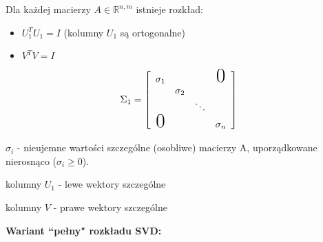 \documentclass[hidelinks,a4paper,fleqn,oneside]{book}
\newcommand{\RR}{\mathbb{R}}
\newcommand{\eye}{I}
\begin{document}
Dla każdej macierzy $A \in \RR^{n, m}$ istnieje rozkład:
\begin{itemize}
  \item $U_1^TU_1 = \eye$ (kolumny $U_1$ są ortogonalne)
  \item $V^TV = I$
\end{itemize}
\[
\Sigma_1 = \left[\begin{array}{cccc} \sigma_1 & & & \text{\huge 0} \\
 & \sigma_2 & & \\ & & \ddots & \\ \text{\huge 0} & & & \sigma_n \end{array}\right]
\]

$\sigma _{i}$ - nieujemne wartości szczególne (osobliwe) macierzy A, uporządkowane nierosnąco ($\sigma_{i} \geq 0$).

kolumny $U_1$ - lewe wektory szczególne

kolumny $V$ - prawe wektory szczególne

\textbf{Wariant ``pełny" rozkładu SVD:}

\end{document}
